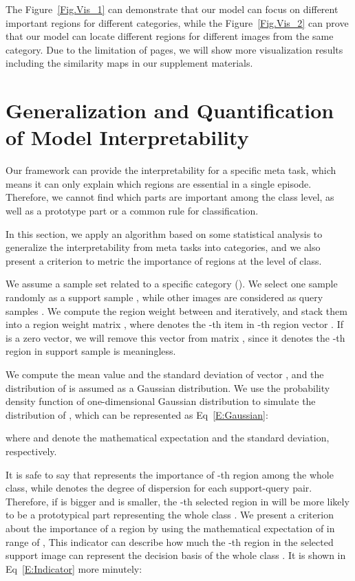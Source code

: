 \documentclass[letterpaper]{article}
\begin{document}
The Figure~\ref{Fig.Vis_1} can demonstrate that our model can focus on different important regions for different categories, while the Figure~\ref{Fig.Vis_2} can prove that our model can locate different regions for different images from the same category. Due to the limitation of pages, we will show more visualization results including the similarity maps in our supplement materials.


\section{Generalization and Quantification of Model Interpretability}\label{section: Generalization}
Our framework can provide the interpretability for a specific meta task, which means it can only explain which regions are essential in a single episode. Therefore, we cannot find which parts are important among the class level, as well as a prototype part or a common rule for classification. 

In this section, we apply an algorithm based on some statistical analysis to generalize the interpretability from meta tasks into categories, and we also present a criterion to metric the importance of regions at the level of class.

We assume a sample set   related to a specific category (). We select one sample randomly as a support sample , while other images are considered as query samples . We compute the region weight  between  and  iteratively, and stack them into a region weight matrix , where  denotes the -th item in -th region vector . 
If  is a zero vector, we will remove this vector from matrix , since it denotes the -th region in support sample is meaningless. 

We compute the mean value  and the standard deviation  of vector , and the distribution of  is assumed as a Gaussian distribution. We use the probability density function of one-dimensional Gaussian distribution to simulate the distribution of , which can be represented as Eq~\ref{E:Gaussian}:

where  and  denote the mathematical expectation and the standard deviation, respectively. 

It is safe to say that  represents the importance of -th region among the whole class, while  denotes the degree of dispersion for each support-query pair. Therefore, if  is bigger and  is smaller, the -th selected region in  will be more likely to be a prototypical part representing the whole class . We present a criterion about the importance of a region by using the mathematical expectation of  in range of , This indicator can describe how much the -th region in the selected support image can represent the decision basis of the whole class . It is shown in Eq~\ref{E:Indicator} more minutely:
\end{document}
